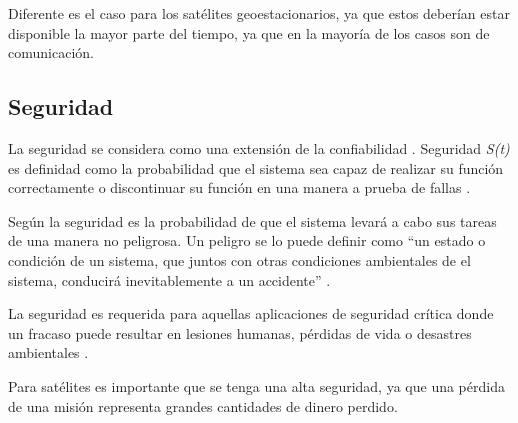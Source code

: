 Diferente es el caso para los satélites geoestacionarios, ya que estos deberían estar disponible la
mayor parte del tiempo, ya que en la mayoría de los casos son de comunicación.

\subsection{Seguridad}\label{subsec:seguridad}
La seguridad se considera como una extensión de la confiabilidad \citep{FTDesign}. Seguridad
\textit{S(t)} es definidad como la probabilidad que el sistema sea capaz de realizar su función
correctamente o discontinuar su función en una manera a prueba de fallas \citep{FTDesign}.

Según \cite{SoftwareFaultToleranceATutorial} la seguridad es la probabilidad de que el sistema
levará a cabo sus tareas de una manera no peligrosa. Un peligro se lo puede definir como ``un
estado o condición de un sistema, que juntos con otras condiciones ambientales de el sistema,
conducirá inevitablemente a un accidente'' \citep{SoftwareFaultToleranceATutorial}.

La seguridad es requerida para aquellas aplicaciones de seguridad crítica donde un fracaso puede
resultar en lesiones humanas, pérdidas de vida o desastres ambientales \citep{FTDesign}.

Para satélites es importante que se tenga una alta seguridad, ya que una pérdida de una misión
representa grandes cantidades de dinero perdido.
